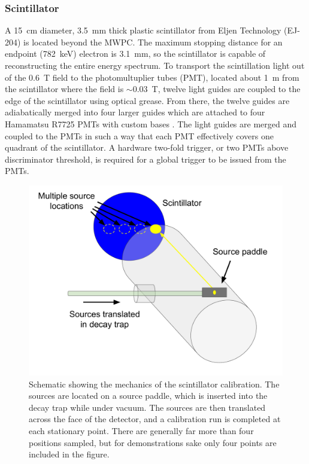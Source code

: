 \subsubsection{Scintillator}

A 15~cm diameter, 3.5~mm thick plastic scintillator \cite{plaster2012}
from Eljen Technology (EJ-204) is located beyond the
MWPC. The maximum stopping distance for an endpoint (782~keV) electron is 3.1~mm, so the
scintillator is capable of reconstructing the entire energy spectrum. To transport the
scintillation light out of the 0.6~T field to the photomultuplier tubes (PMT),
located about 1~m from the scintillator where the field is $\sim0.03$~T,
twelve light guides are coupled to the edge of the scintillator using optical grease.
From there, the twelve guides are adiabatically merged into four
larger guides which are attached to four Hamamatsu R7725 PMTs with custom bases \cite{hickerson2013}.
The light guides are merged and coupled to the PMTs in such a way that each PMT effectively
covers one quadrant of the scintillator.
A hardware two-fold trigger, or two PMTs above discriminator threshold, is required for a
global trigger to be issued from the PMTs.

\begin{figure}[h]
  \centering
  \includegraphics[scale=0.5]{2-UCNAExperiment/calProcess.pdf}
  \caption{Schematic showing the mechanics of the scintillator calibration. The sources
    are located on a source paddle, which is inserted into the decay trap while under
    vacuum. The sources are then translated across the face of the detector, and a
    calibration run is completed at each stationary point. There are generally far more
    than four positions sampled, but for demonstrations sake only four points are
    included in the figure.}
  \label{fig:sourceTranslate}
\end{figure}

